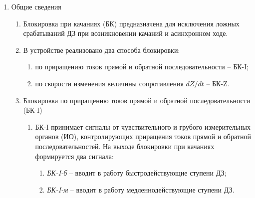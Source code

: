 
\color{black}

\begin{enumerate}[label=\arabic{section}.\arabic{subsection}.\arabic{enumi}, labelsep=4pt, leftmargin=0pt, itemindent=57pt, itemsep=0pt, parsep=5pt] %
\item Общие сведения

\begin{enumerate}[label=\arabic{section}.\arabic{subsection}.\arabic{enumi}.\arabic*, labelsep=4pt, leftmargin=0em, itemindent=65pt, parsep=0pt]

\item
Блокировка при качаниях (БК) предназначена для исключения ложных срабатываний ДЗ при возникновении качаний и асинхронном ходе.
\item 
В устройстве реализовано два способа блокировки:

\begin{enumerate}[label=\arabic*)]
\item по приращению токов прямой и обратной последовательности -- БК-I;
\item по скорости изменения величины сопротивления $dZ/dt$ -- БК-Z.
\end{enumerate}

\item\label{sec:bki} Блокировка по приращению токов прямой и обратной последовательности (БК-I)
\begin{enumerate}[label=\arabic{section}.\arabic{subsection}.\arabic{enumi}.\arabic*, labelsep=4pt, leftmargin=0em, itemindent=65pt, parsep=0pt]


\item 
БК-I принимает сигналы от чувствительного и грубого измерительных органов (ИО), контролирующих приращения токов прямой и обратной последовательностей. На выходе блокировки при качаниях формируется два сигнала:

\begin{enumerate}[label=\arabic*)]
\item \textit{БК-I-б} -- вводит в работу быстродействующие ступени ДЗ;
\item \textit{БК-I-м} -- вводит в работу медленнодействующие ступени ДЗ.
\end{enumerate}


\end{enumerate}
\end{enumerate}
\end{enumerate}
